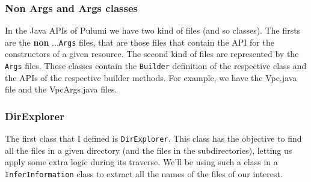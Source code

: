 \subsubsection{Non Args and Args classes}
In the Java APIs of Pulumi we have two kind of files (and so classes).
The firsts are the \textbf{non} ...\texttt{Args} files, that are those files that contain the API for the constructors of a given resource.
The second kind of files are represented by the \texttt{Args} files.
These classes contain the \texttt{Builder} definition of the respective class and the APIs of the respective builder methods. %
For example, we have the Vpc.java file and the VpcArgs.java files.

\subsubsection{DirExplorer}
The first class that I defined is \texttt{DirExplorer}. This class has the objective to find all the files in a given directory (and the files in the subdirectories), letting us apply some extra logic during its traverse.
We'll be using such a class in a \texttt{InferInformation} class to extract all the names of the files of our interest.\\

